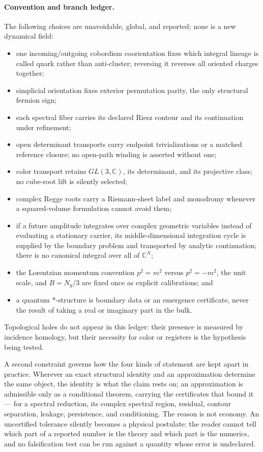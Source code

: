 \documentclass[11pt,letterpaper]{article}
\begin{document}
\paragraph{Convention and branch ledger.}
The following choices are unavoidable, global, and reported; none is a new
dynamical field:
\begin{itemize}
  \item one incoming/outgoing cobordism coorientation fixes which integral
    lineage is called quark rather than anti-cluster; reversing it reverses all
    oriented charges together;
  \item simplicial orientation fixes exterior permutation parity, the only
    structural fermion sign;
  \item each spectral fiber carries its declared Riesz contour and its
    continuation under refinement;
  \item open determinant transports carry endpoint trivializations or a
    matched reference closure; no open-path winding is asserted without one;
  \item color transport retains $GL(3,\mathbb C)$, its determinant, and its
    projective class; no cube-root lift is silently selected;
  \item complex Regge roots carry a Riemann-sheet label and monodromy whenever
    a squared-volume formulation cannot avoid them;
  \item if a future amplitude integrates over complex geometric variables
    instead of evaluating a stationary carrier, its middle-dimensional
    integration cycle is supplied by the boundary problem and transported by
    analytic continuation; there is no canonical integral over all of
    $\mathbb C^N$;
  \item the Lorentzian momentum convention $p^2=m^2$ versus $p^2=-m^2$, the
    unit scale, and $B=N_q/3$ are fixed once as explicit calibrations; and
  \item a quantum $*$-structure is boundary data or an emergence certificate,
    never the result of taking a real or imaginary part in the bulk.
\end{itemize}
Topological holes do not appear in this ledger: their presence is measured by
incidence homology, but their necessity for color or registers is the
hypothesis being tested.

A second constraint governs how the four kinds of statement are kept apart in
practice. Wherever an exact structural identity and an approximation determine
the same object, the identity is what the claim rests on; an approximation is
admissible only as a conditional theorem, carrying the certificates that bound
it --- for a spectral reduction, its complex spectral region, residual,
contour separation, leakage, persistence, and conditioning. The reason is not
economy. An uncertified
tolerance silently becomes a physical postulate: the reader cannot tell which
part of a reported number is the theory and which part is the numerics, and no
falsification test can be run against a quantity whose error is undeclared.
\end{document}
